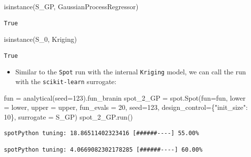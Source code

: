 \documentclass[
  letterpaper,
  DIV=11,
  numbers=noendperiod]{scrreprt}
\newenvironment{Shaded}{\begin{snugshade}}{\end{snugshade}}
\newcommand{\BuiltInTok}[1]{\textcolor[rgb]{0.00,0.23,0.31}{#1}}
\newcommand{\DecValTok}[1]{\textcolor[rgb]{0.68,0.00,0.00}{#1}}
\newcommand{\NormalTok}[1]{\textcolor[rgb]{0.00,0.23,0.31}{#1}}
\newcommand{\OperatorTok}[1]{\textcolor[rgb]{0.37,0.37,0.37}{#1}}
\newcommand{\StringTok}[1]{\textcolor[rgb]{0.13,0.47,0.30}{#1}}
\providecommand{\tightlist}{%
  \setlength{\itemsep}{0pt}\setlength{\parskip}{0pt}}\usepackage{longtable,booktabs,array}
\begin{document}
\begin{Shaded}
\begin{Highlighting}[]
\BuiltInTok{isinstance}\NormalTok{(S\_GP, GaussianProcessRegressor)}
\end{Highlighting}
\end{Shaded}

\begin{verbatim}
True
\end{verbatim}

\begin{Shaded}
\begin{Highlighting}[]
\BuiltInTok{isinstance}\NormalTok{(S\_0, Kriging)}
\end{Highlighting}
\end{Shaded}

\begin{verbatim}
True
\end{verbatim}

\begin{itemize}
\tightlist
\item
  Similar to the \texttt{Spot} run with the internal \texttt{Kriging}
  model, we can call the run with the \texttt{scikit-learn} surrogate:
\end{itemize}

\begin{Shaded}
\begin{Highlighting}[]
\NormalTok{fun }\OperatorTok{=}\NormalTok{ analytical(seed}\OperatorTok{=}\DecValTok{123}\NormalTok{).fun\_branin}
\NormalTok{spot\_2\_GP }\OperatorTok{=}\NormalTok{ spot.Spot(fun}\OperatorTok{=}\NormalTok{fun,}
\NormalTok{                   lower }\OperatorTok{=}\NormalTok{ lower,}
\NormalTok{                   upper }\OperatorTok{=}\NormalTok{ upper,}
\NormalTok{                   fun\_evals }\OperatorTok{=} \DecValTok{20}\NormalTok{,}
\NormalTok{                   seed}\OperatorTok{=}\DecValTok{123}\NormalTok{,}
\NormalTok{                   design\_control}\OperatorTok{=}\NormalTok{\{}\StringTok{"init\_size"}\NormalTok{: }\DecValTok{10}\NormalTok{\},}
\NormalTok{                   surrogate }\OperatorTok{=}\NormalTok{ S\_GP)}
\NormalTok{spot\_2\_GP.run()}
\end{Highlighting}
\end{Shaded}

\begin{verbatim}
spotPython tuning: 18.86511402323416 [######----] 55.00% 
\end{verbatim}

\begin{verbatim}
spotPython tuning: 4.0669082302178285 [######----] 60.00% 
\end{verbatim}
\end{document}

